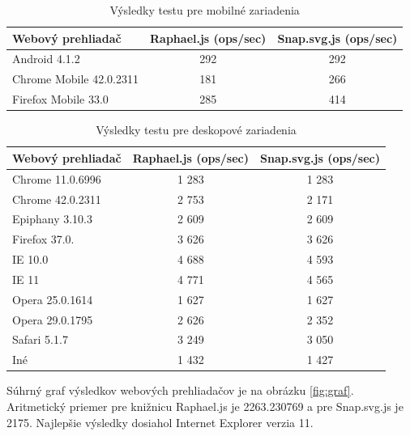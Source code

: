 \begin{table}[H]
	
\begin{center}

\begin{tabular}{|l|c|c|}
	\hline \textbf{Webový prehliadač} & \textbf{Raphael.js (ops/sec)} & \textbf{Snap.svg.js (ops/sec)} \\ 
	\hline Android 4.1.2 & 292 & 292 \\  
	\hline Chrome Mobile 42.0.2311 & 181 & 266 \\ 
	\hline Firefox Mobile 33.0 & 285 & 414 \\ 
	\hline 
\end{tabular} 
\end{center}

\caption{Výsledky testu pre mobilné zariadenia}
\label{tab:mobily}
	\end{table}

\begin{table}[H]
\begin{center}
		\begin{tabular}{|l|c|c|}
		\hline \textbf{Webový prehliadač} & \textbf{Raphael.js (ops/sec)} & \textbf{Snap.svg.js (ops/sec)} \\ 
        \hline Chrome 11.0.6996 & 1 283 & 1 283 \\
		\hline Chrome 42.0.2311 & 2 753 & 2 171 \\ 
		\hline Epiphany 3.10.3 & 2 609 & 2 609 \\ 
		\hline Firefox 37.0. & 3 626 & 3 626 \\ 
	
			\hline IE 10.0 & 4 688 & 4 593 \\ 
			\hline IE 11 & 4 771 & 4 565 \\ 
			\hline Opera 25.0.1614 & 1 627 & 1 627 \\ 
			\hline Opera 29.0.1795 & 2 626 & 2 352 \\ 
			\hline Safari 5.1.7 & 3 249 & 3 050 \\ 
			\hline Iné & 1 432 & 1 427 \\ 
			\hline 
	
	\end{tabular} 
	
\end{center}
	\caption{Výsledky testu pre deskopové zariadenia}
	\label{tab:pocitace}
\end{table}

Súhrný graf výsledkov webových prehliadačov je na obrázku \ref{fig:graf}. Aritmetický priemer pre knižnicu Raphael.js je 2263.230769 a pre Snap.svg.js je 2175. Najlepšie výsledky dosiahol Internet Explorer verzia 11. 

